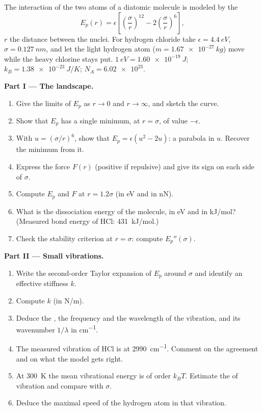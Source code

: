 \begin{problem}
\label{pb:b1:work-and-energy:1}
The interaction of the two atoms of a diatomic molecule is modeled by
the 
\[
E_p(r) = \epsilon\left[\left(\frac{\sigma}{r}\right)^{12} - 2\left(\frac{\sigma}{r}\right)^{6}\right],
\]
$r$ the distance between the nuclei. For hydrogen chloride take
$\epsilon = \qty{4.4}{eV}$, $\sigma = \qty{0.127}{nm}$, and let the light
hydrogen atom ($m = \qty{1.67e-27}{kg}$) move while the heavy chlorine
stays put. $\qty{1}{eV} = \qty{1.60e-19}{J}$; $k_B = \qty{1.38e-23}{J/K}$;
$N_A = \num{6.02e23}$.

\medskip
\noindent\textbf{Part I --- The landscape.}
\begin{enumerate}
  \item Give the limits of $E_p$ as $r \to 0$ and $r \to \infty$, and
        sketch the curve.
  \item Show that $E_p$ has a single minimum, at $r = \sigma$, of value
        $-\epsilon$.
  \item With $u = (\sigma/r)^6$, show that $E_p = \epsilon(u^2 - 2u)$: a
        parabola in $u$. Recover the minimum from it.
  \item Express the force $F(r)$ (positive if repulsive) and give its
        sign on each side of $\sigma$.
  \item Compute $E_p$ and $F$ at $r = 1.2\sigma$ (in eV and in nN).
  \item What is the dissociation energy of the molecule, in eV and in
        \unit{kJ/mol}? (Measured bond energy of HCl: \qty{431}{kJ/mol}.)
  \item Check the stability criterion at $r = \sigma$: compute
        $E_p''(\sigma)$.
\end{enumerate}

\medskip
\noindent\textbf{Part II --- Small vibrations.}
\begin{enumerate}[resume]
  \item Write the second-order Taylor expansion of $E_p$ around $\sigma$
        and identify an effective stiffness $k$.
  \item Compute $k$ (in \unit{N/m}).
  \item Deduce the , the frequency and the wavelength
        of the vibration, and its wavenumber $1/\lambda$ in \unit{cm^{-1}}.
  \item The measured vibration of HCl is at \qty{2990}{cm^{-1}}. Comment
        on the agreement and on what the model gets right.
  \item At \qty{300}{K} the mean vibrational energy is of order $k_BT$.
        Estimate the  of vibration and compare with $\sigma$.
  \item Deduce the maximal speed of the hydrogen atom in that
        vibration.
\end{enumerate}


\end{problem}
